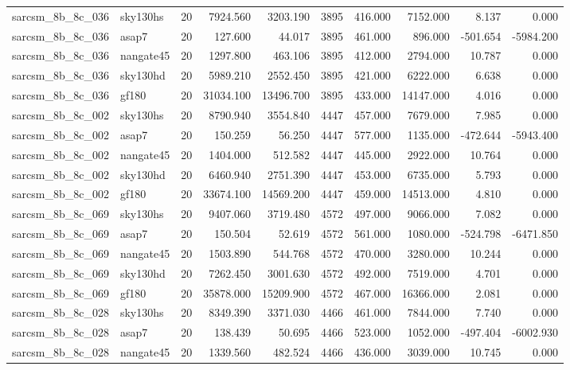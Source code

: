 \documentclass{article}
\begin{document}
\begin{longtable}{llrrrrrrrr}
sarcsm\_8b\_8c\_036 & sky130hs & 20 & 7924.560 & 3203.190 & 3895 & 416.000 & 7152.000 & 8.137 & 0.000 \\
sarcsm\_8b\_8c\_036 & asap7 & 20 & 127.600 & 44.017 & 3895 & 461.000 & 896.000 & -501.654 & -5984.200 \\
sarcsm\_8b\_8c\_036 & nangate45 & 20 & 1297.800 & 463.106 & 3895 & 412.000 & 2794.000 & 10.787 & 0.000 \\
sarcsm\_8b\_8c\_036 & sky130hd & 20 & 5989.210 & 2552.450 & 3895 & 421.000 & 6222.000 & 6.638 & 0.000 \\
sarcsm\_8b\_8c\_036 & gf180 & 20 & 31034.100 & 13496.700 & 3895 & 433.000 & 14147.000 & 4.016 & 0.000 \\
sarcsm\_8b\_8c\_002 & sky130hs & 20 & 8790.940 & 3554.840 & 4447 & 457.000 & 7679.000 & 7.985 & 0.000 \\
sarcsm\_8b\_8c\_002 & asap7 & 20 & 150.259 & 56.250 & 4447 & 577.000 & 1135.000 & -472.644 & -5943.400 \\
sarcsm\_8b\_8c\_002 & nangate45 & 20 & 1404.000 & 512.582 & 4447 & 445.000 & 2922.000 & 10.764 & 0.000 \\
sarcsm\_8b\_8c\_002 & sky130hd & 20 & 6460.940 & 2751.390 & 4447 & 453.000 & 6735.000 & 5.793 & 0.000 \\
sarcsm\_8b\_8c\_002 & gf180 & 20 & 33674.100 & 14569.200 & 4447 & 459.000 & 14513.000 & 4.810 & 0.000 \\
sarcsm\_8b\_8c\_069 & sky130hs & 20 & 9407.060 & 3719.480 & 4572 & 497.000 & 9066.000 & 7.082 & 0.000 \\
sarcsm\_8b\_8c\_069 & asap7 & 20 & 150.504 & 52.619 & 4572 & 561.000 & 1080.000 & -524.798 & -6471.850 \\
sarcsm\_8b\_8c\_069 & nangate45 & 20 & 1503.890 & 544.768 & 4572 & 470.000 & 3280.000 & 10.244 & 0.000 \\
sarcsm\_8b\_8c\_069 & sky130hd & 20 & 7262.450 & 3001.630 & 4572 & 492.000 & 7519.000 & 4.701 & 0.000 \\
sarcsm\_8b\_8c\_069 & gf180 & 20 & 35878.000 & 15209.900 & 4572 & 467.000 & 16366.000 & 2.081 & 0.000 \\
sarcsm\_8b\_8c\_028 & sky130hs & 20 & 8349.390 & 3371.030 & 4466 & 461.000 & 7844.000 & 7.740 & 0.000 \\
sarcsm\_8b\_8c\_028 & asap7 & 20 & 138.439 & 50.695 & 4466 & 523.000 & 1052.000 & -497.404 & -6002.930 \\
sarcsm\_8b\_8c\_028 & nangate45 & 20 & 1339.560 & 482.524 & 4466 & 436.000 & 3039.000 & 10.745 & 0.000 \\

\end{longtable}
\end{document}
